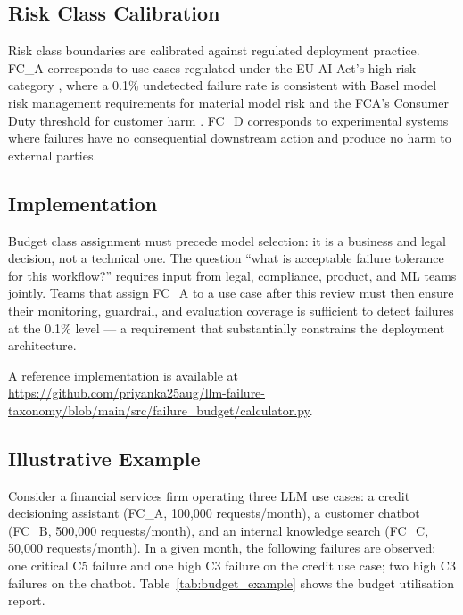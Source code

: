 \documentclass{article}
\begin{document}
\subsection{Risk Class Calibration}

Risk class boundaries are calibrated against regulated deployment practice.
FC\_A corresponds to use cases regulated under the EU AI Act's high-risk
category \citep{euaiact2024}, where a 0.1\% undetected failure rate is
consistent with Basel model risk management requirements for material model
risk \citep{dora2022} and the FCA's Consumer Duty threshold for customer harm
\citep{fcaconsumerduty2024}.  FC\_D corresponds to experimental systems where
failures have no consequential downstream action and produce no harm to
external parties.

\subsection{Implementation}

Budget class assignment must precede model selection: it is a business and
legal decision, not a technical one.  The question ``what is acceptable failure
tolerance for this workflow?'' requires input from legal, compliance, product,
and ML teams jointly.  Teams that assign FC\_A to a use case after this review
must then ensure their monitoring, guardrail, and evaluation coverage is
sufficient to detect failures at the 0.1\% level --- a requirement that
substantially constrains the deployment architecture.

A reference implementation is available at
\url{https://github.com/priyanka25aug/llm-failure-taxonomy/blob/main/src/failure_budget/calculator.py}.

\subsection{Illustrative Example}

Consider a financial services firm operating three LLM use cases: a credit
decisioning assistant (FC\_A, 100{,}000 requests/month), a customer chatbot
(FC\_B, 500{,}000 requests/month), and an internal knowledge search (FC\_C,
50{,}000 requests/month).  In a given month, the following failures are
observed: one critical C5 failure and one high C3 failure on the credit use
case; two high C3 failures on the chatbot.  Table~\ref{tab:budget_example}
shows the budget utilisation report.
\end{document}
